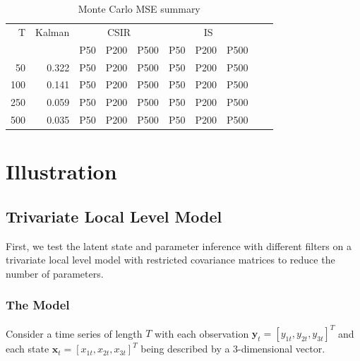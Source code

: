 \documentclass[11pt, oneside]{scrreprt}   	%
\begin{document}
\begin{table}[h!]
\centering
\begin{tabular}{rrrrrrrrrr}
\hline
T  & Kalman &  \multicolumn{3}{c}{CSIR} &  \multicolumn{3}{c}{IS}\\
\cline{3-8}
& & P50 & P200 & P500 & P50 & P200 & P500\\
\hline
50        & 0.322 & P50 & P200 & P500 & P50 & P200 & P500\\
100      & 0.141 & P50 & P200 & P500 & P50 & P200 & P500\\
250      & 0.059 & P50 & P200 & P500 & P50 & P200 & P500\\
500      & 0.035 & P50 & P200 & P500 & P50 & P200 & P500\\
\hline
\end{tabular}
\caption{Monte Carlo MSE summary}
\label{tab:param_inference_mse}
\end{table}



\chapter{Illustration}
\label{chp:Illustration}

\section{Trivariate Local Level Model}
First, we test the latent state and parameter inference with different filters on a trivariate local level model with restricted covariance matrices to reduce the number of parameters. 

\subsection{The Model}
Consider a time series of length $T$ with each observation $\boldsymbol{y}_t=[y_{1t}, y_{2t}, y_{3t}]^T$ and each state $\boldsymbol{x}_t=[x_{1t}, x_{2t}, x_{3t}]^T$ being described by a 3-dimensional vector.
\end{document}
